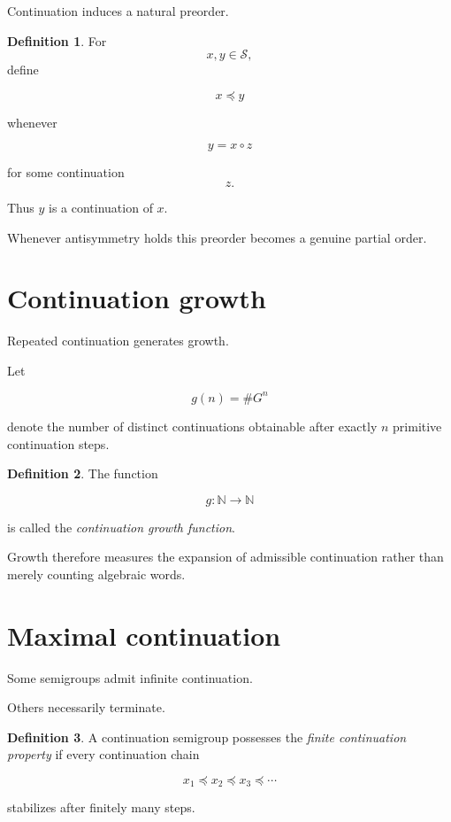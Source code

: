\documentclass[13pt,openany]{book}
\theoremstyle{plain}
\theoremstyle{definition}
\newtheorem{definition}{Definition}[chapter]
\begin{document}
Continuation induces a natural preorder.

\begin{definition}
For
\[
x,y\in\mathcal S,
\]
define

\[
x\preceq y
\]

whenever

\[
y=x\circ z
\]

for some continuation
\[
z.
\]
\end{definition}

Thus $y$ is a continuation of $x$.

Whenever antisymmetry holds this preorder becomes a genuine partial order.

\section{Continuation growth}

Repeated continuation generates growth.

Let

\[
g(n)
=
\#G^n
\]

denote the number of distinct continuations obtainable after exactly $n$
primitive continuation steps.

\begin{definition}
The function

\[
g:\mathbb N\to\mathbb N
\]

is called the \emph{continuation growth function}.
\end{definition}

Growth therefore measures the expansion of admissible continuation rather than
merely counting algebraic words.

\section{Maximal continuation}

Some semigroups admit infinite continuation.

Others necessarily terminate.

\begin{definition}
A continuation semigroup possesses the
\emph{finite continuation property}
if every continuation chain

\[
x_1\preceq x_2\preceq x_3\preceq\cdots
\]

stabilizes after finitely many steps.
\end{definition}
\end{document}
